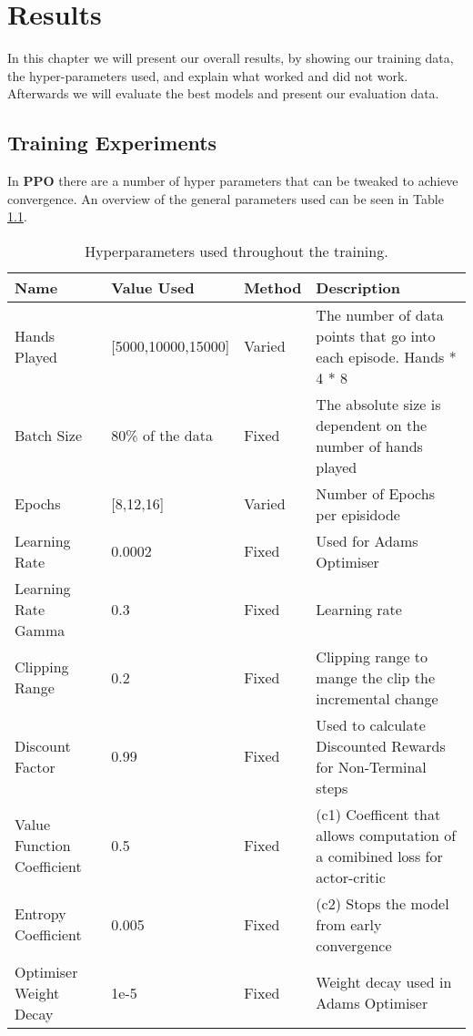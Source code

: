 \chapter{Results}
In this chapter we will present our overall results, by showing our training data, the hyper-parameters used, and
explain what worked and did not work.
Afterwards we will evaluate the best models and present our evaluation data.


\section{Training Experiments}
In \textbf{PPO} there are a number of hyper parameters that can be tweaked to achieve convergence.
An overview of the general parameters used can be seen in Table \ref{tab:hyper}.
\begin{table}[!ht]
    \begin{tabularx}{\linewidth}{lllX}
        \toprule
        Name                       & Value Used       & Method & Description
        \\
        \midrule
        Hands Played & {[}5000,10000,15000{]} & Varied & The number of data points that go into each
        episode. Hands * 4 * 8 \\
        Batch Size                 & 80\% of the data & Fixed  & The absolute size is dependent on the number of
        hands played                 \\
        Epochs & {[}8,12,16{]} & Varied & Number of Epochs per episidode
        \\
        Learning Rate              & 0.0002           & Fixed  & Used for Adams Optimiser
        \\
        Learning Rate Gamma        & 0.3              & Fixed  & Learning rate
        \\
        Clipping Range             & 0.2              & Fixed  & Clipping range to mange the clip the incremental
        change                      \\
        Discount Factor            & 0.99             & Fixed  & Used to calculate Discounted Rewards for
        Non-Terminal steps                  \\
        Value Function Coefficient & 0.5              & Fixed  & (c1) Coefficent that allows computation of a
        comibined loss for actor-critic \\
        Entropy Coefficient        & 0.005            & Fixed  & (c2) Stops the model from early convergence
        \\
        Optimiser Weight Decay     & 1e-5             & Fixed  & Weight decay used in Adams Optimiser
        \\
        \bottomrule
    \end{tabularx}
    \caption{Hyperparameters used throughout the training.}
    \label{tab:hyper}
\end{table}

